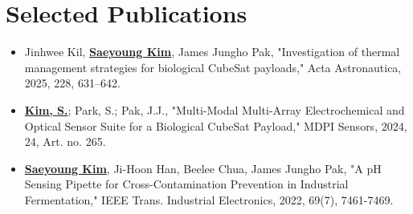 \documentclass[letterpaper,11pt]{moderncv}
\begin{document}
\section{Selected Publications}
\begin{sloppypar}
\begin{itemize}[leftmargin=1cm, itemsep=0pt, parsep=0pt]
    \item Jinhwee Kil, \textbf{\underline{Saeyoung Kim}}, James Jungho Pak, "Investigation of thermal management strategies for biological CubeSat payloads," Acta Astronautica, 2025, 228, 631--642.
    \item \textbf{\underline{Kim, S.}}; Park, S.; Pak, J.J., "Multi-Modal Multi-Array Electrochemical and Optical Sensor Suite for a Biological CubeSat Payload," MDPI Sensors, 2024, 24, Art. no. 265.
    \item \textbf{\underline{Saeyoung Kim}}, Ji-Hoon Han, Beelee Chua, James Jungho Pak, "A pH Sensing Pipette for Cross-Contamination Prevention in Industrial Fermentation," IEEE Trans. Industrial Electronics, 2022, 69(7), 7461-7469.
\end{itemize}
\end{sloppypar}

\vfill
{}
\end{document}
